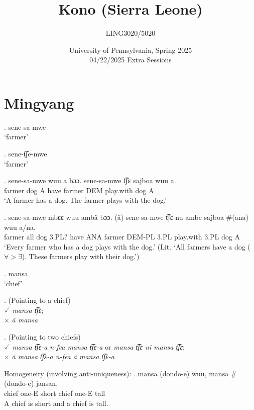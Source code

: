 \documentclass{assets/fieldnotes}
\title{Kono (Sierra Leone)}
\author{LING3020/5020}
\date{University of Pennsylvania, Spring 2025\\04/22/2025 Extra Sessions}
\begin{document}
\maketitle

\maketitle
\tableofcontents

\section{Mingyang}
\ex. sene-sa-mwe\\
    `farmer'

\ex. sene-t͡ʃe-mwe\\
    `farmer'

\exg. sene-sa-mwe wuu a bɔɔ. sene-sa-mwe t͡ʃɛ sajboa wuu a.\\
        farmer dog A have farmer DEM play.with dog A\\
        `A farmer has a dog. The farmer plays with the dog.'

\exg. sene-sa-mwe mbɛɛ wuu ambã bɔɔ. (ã) sene-sa-mwe t͡ʃɛ-nu ambe sajboa \#(ana) wuu a/na.\\
    farmer all dog 3.PL? have ANA farmer DEM-PL 3.PL play.with 3.PL dog A\\
    `Every farmer who has a dog plays with the dog.' (Lit. `All farmers have a dog ($\forall > \exists$). These farmers play with their dog.')


\ex. mansa\\
    `chief'

\ex. (Pointing to a chief)\\
    $\checked$ \textit{mansa t͡ʃɛ};\\
    $\times$ \textit{ã mansa}

\ex. (Pointing to two chiefs)\\
    $\checked$ \textit{mansa t͡ʃɛ-a n-fea mansa t͡ʃɛ-a} or \textit{mansa t͡ʃɛ ni mansa t͡ʃɛ};\\
    $\times$ \textit{ã mansa t͡ʃɛ-a n-fea ã mansa t͡ʃɛ-a}

Homogeneity (involving anti-uniqueness):
\exg. mansa (dondo-e) wuu, mansa \#(dondo-e) jansan.\\
    chief one-E short chief one-E tall\\
    A chief is short and a chief is tall.
\end{document}
